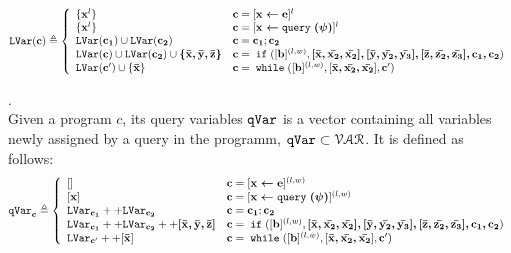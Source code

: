 \begin{defn}
$$
  \lvar({\ssa{c}}) \triangleq
  \left\{
  \begin{array}{ll}
      \{\ssa{x}^l\}                   
      & \ssa{c} = [\ssa{\assign x e}]^{l} 
      \\
      \{\ssa{x}^l\}                   
      & \ssa{c} = [\ssa{\assign x \query(\qexpr)}]^{l} 
      \\
      \lvar{(\ssa{c_1})} \cup \lvar{(\ssa{c_2})}  
      & \ssa{c} = \ssa{c_1};\ssa{c_2}
      \\
      \lvar({\ssa{c}}) \cup \lvar({\ssa{c_2}}) \cup \ssa{\{\bar{x}, \bar{y}, \bar{z}\}} 
      & \ssa{c} =\eif([\sbexpr]^{(l, w)} , \ssa{[\bar{x}, \bar{x_2}, \bar{x_2}], 
      [\bar{y}, \bar{y_2}, \bar{y_3}], 
      [\bar{z}, \bar{z_2}, \bar{z_3}], c_1, c_2}) 
      \\
      \lvar({\ssa{c}'}) \cup \{\ssa{\bar{x}}\}
      & \ssa{c}   = \ewhile ([\sbexpr]^{(l, w)}, [\ssa{\bar{x}, \bar{x_2}, \bar{x_2}}], \ssa{c}')
\end{array}
\right.
$$
\end{defn}
%
\begin{defn}.
\\
Given a program $c$, its query variables $\mathtt{qVar}$ is a vector containing all variables newly assigned by a query in the programm, $\mathtt{qVar} \subset \mathcal{VAR}$.
It is defined as follows:
$$
  \qvar_{\ssa{c}} \triangleq
  \left\{
  \begin{array}{ll}
      []                  
      & \ssa{c} = [\ssa{\assign x e}]^{(l, w)} 
      \\
      \left[ \ssa{x} \right]                  
      & \ssa{c} = [\ssa{\assign x \query(\qexpr)}]^{(l, w)} 
      \\
      \lvar_{\ssa{c_1}} ++ \lvar_{\ssa{c_2}}  
      & \ssa{c} = \ssa{c_1};\ssa{c_2}
      \\
      \lvar_{\ssa{c_1}} ++ \lvar_{\ssa{c_2}} ++ \ssa{[\bar{x}, \bar{y}, \bar{z}]} 
      & \ssa{c} =\eif([\sbexpr]^{(l, w)} , \ssa{[\bar{x}, \bar{x_2}, \bar{x_2}], 
      [\bar{y}, \bar{y_2}, \bar{y_3}], 
      [\bar{z}, \bar{z_2}, \bar{z_3}], c_1, c_2}) 
      \\
      \lvar_{\ssa{c}'} ++ [\ssa{\bar{x}}]
      & \ssa{c}   = \ewhile ([\sbexpr]^{(l, w)}, [\ssa{\bar{x}, \bar{x_2}, \bar{x_2}}], \ssa{c}')
\end{array}
\right.
$$
\end{defn}
%
%
%
